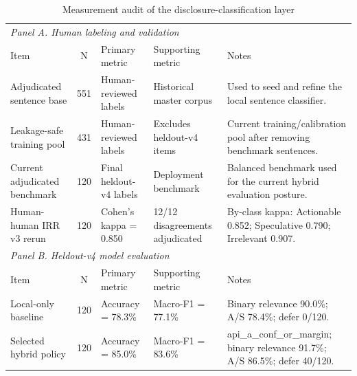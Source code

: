 \begin{table}[!htbp]
\centering
\caption{Measurement audit of the disclosure-classification layer}
\begin{tabular}{p{2.8cm}cp{2.8cm}p{2.8cm}p{5.4cm}}
\hline
\multicolumn{5}{l}{\textit{Panel A. Human labeling and validation}} \\
Item & N & Primary metric & Supporting metric & Notes \\
Adjudicated sentence base & 551 & Human-reviewed labels & Historical master corpus & Used to seed and refine the local sentence classifier. \\
Leakage-safe training pool & 431 & Human-reviewed labels & Excludes heldout-v4 items & Current training/calibration pool after removing benchmark sentences. \\
Current adjudicated benchmark & 120 & Final heldout-v4 labels & Deployment benchmark & Balanced benchmark used for the current hybrid evaluation posture. \\
Human-human IRR v3 rerun & 120 & Cohen's kappa = 0.850 & 12/12 disagreements adjudicated & By-class kappa: Actionable 0.852; Speculative 0.790; Irrelevant 0.907. \\
\multicolumn{5}{l}{\textit{Panel B. Heldout-v4 model evaluation}} \\
Item & N & Primary metric & Supporting metric & Notes \\
Local-only baseline & 120 & Accuracy = 78.3\% & Macro-F1 = 77.1\% & Binary relevance 90.0\%; A/S 78.4\%; defer 0/120. \\
Selected hybrid policy & 120 & Accuracy = 85.0\% & Macro-F1 = 83.6\% & api\_a\_conf\_or\_margin; binary relevance 91.7\%; A/S 86.5\%; defer 40/120. \\
\hline
\end{tabular}
\end{table}
